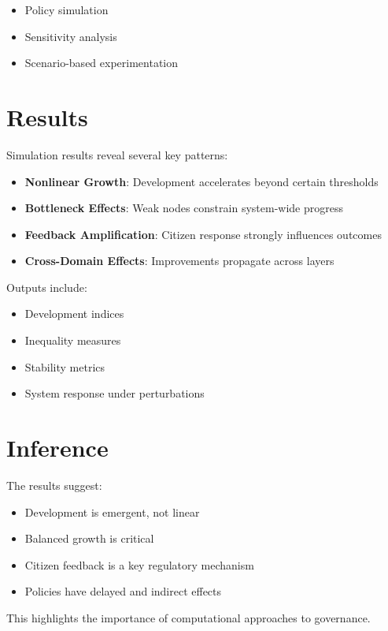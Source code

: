 \documentclass[12pt]{article}
\begin{document}
\begin{itemize}
\item Policy simulation
\item Sensitivity analysis
\item Scenario-based experimentation
\end{itemize}

\section{Results}

Simulation results reveal several key patterns:

\begin{itemize}
\item \textbf{Nonlinear Growth}: Development accelerates beyond certain thresholds
\item \textbf{Bottleneck Effects}: Weak nodes constrain system-wide progress
\item \textbf{Feedback Amplification}: Citizen response strongly influences outcomes
\item \textbf{Cross-Domain Effects}: Improvements propagate across layers
\end{itemize}

Outputs include:

\begin{itemize}
\item Development indices
\item Inequality measures
\item Stability metrics
\item System response under perturbations
\end{itemize}

\section{Inference}

The results suggest:

\begin{itemize}
\item Development is emergent, not linear
\item Balanced growth is critical
\item Citizen feedback is a key regulatory mechanism
\item Policies have delayed and indirect effects
\end{itemize}

This highlights the importance of computational approaches to governance.
\end{document}
